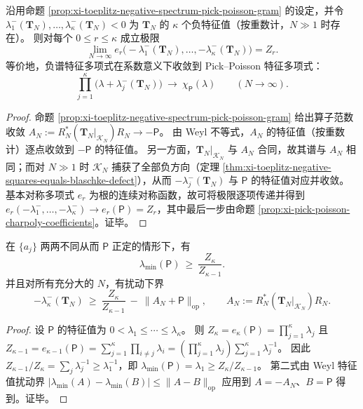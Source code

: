 \begin{proposition}\label{prop:xi-toeplitz-negative-spectrum-coefficient-limit}
沿用命题 \ref{prop:xi-toeplitz-negative-spectrum-pick-poisson-gram} 的设定，并令
\(\lambda_1^-(\mathbf{T}_N),\dots,\lambda_\kappa^-(\mathbf{T}_N)<0\)
为 \(\mathbf{T}_N\) 的 \(\kappa\) 个负特征值（按重数计，\(N\gg 1\) 时存在）。
则对每个 \(0\le r\le\kappa\) 成立极限
\[
\boxed{\;
\lim_{N\to\infty}e_r\!\bigl(-\lambda_1^-(\mathbf{T}_N),\dots,-\lambda_\kappa^-(\mathbf{T}_N)\bigr)=Z_r.\;}
\]
等价地，负谱特征多项式在系数意义下收敛到 Pick--Poisson 特征多项式：
\[
\boxed{\;
\prod_{j=1}^{\kappa}\bigl(\lambda+\lambda_j^-(\mathbf{T}_N)\bigr)\ \longrightarrow\ \chi_{\mathsf P}(\lambda)\qquad(N\to\infty).\;}
\]
\end{proposition}
\begin{proof}
命题 \ref{prop:xi-toeplitz-negative-spectrum-pick-poisson-gram} 给出算子范数收敛
\(
A_N:=R_N^\ast(\mathbf{T}_N|_{\mathcal K_N})R_N\to-\mathsf P
\)。
由 Weyl 不等式，\(A_N\) 的特征值（按重数计）逐点收敛到 \(-\mathsf P\) 的特征值。
另一方面，\(\mathbf{T}_N|_{\mathcal K_N}\) 与 \(A_N\) 合同，故其谱与 \(A_N\) 相同；而对 \(N\gg 1\) 时 \(\mathcal K_N\) 捕获了全部负方向（定理 \ref{thm:xi-toeplitz-negative-squares-equals-blaschke-defect}），从而 \(-\lambda_j^-(\mathbf{T}_N)\) 与 \(\mathsf P\) 的特征值对应并收敛。
基本对称多项式 \(e_r\) 为根的连续对称函数，故可将极限逐项传递并得到
\(
e_r(-\lambda_1^-,\dots,-\lambda_\kappa^-)\to e_r(\mathsf P)=Z_r
\)，其中最后一步由命题 \ref{prop:xi-pick-poisson-charpoly-coefficients}。证毕。
\end{proof}

\begin{corollary}\label{cor:xi-pick-poisson-lambda-min-ratio-bound}
在 \(\{a_j\}\) 两两不同从而 \(\mathsf P\) 正定的情形下，有
\[
\boxed{\;\lambda_{\min}(\mathsf P)\ \ge\ \frac{Z_\kappa}{Z_{\kappa-1}}.\;}
\]
并且对所有充分大的 \(N\)，有扰动下界
\[
-\lambda_\kappa^{-}(\mathbf{T}_N)\ \ge\ \frac{Z_\kappa}{Z_{\kappa-1}}\ -\ \|A_N+\mathsf P\|_{\mathrm{op}},
\qquad
A_N:=R_N^\ast(\mathbf{T}_N|_{\mathcal K_N})R_N.
\]
\end{corollary}
\begin{proof}
设 \(\mathsf P\) 的特征值为 \(0<\lambda_1\le\cdots\le\lambda_\kappa\)。
则
\(
Z_\kappa=e_\kappa(\mathsf P)=\prod_{j=1}^\kappa \lambda_j
\)
且
\(
Z_{\kappa-1}=e_{\kappa-1}(\mathsf P)=\sum_{j=1}^\kappa\prod_{i\ne j}\lambda_i
=(\prod_{j=1}^\kappa\lambda_j)\sum_{j=1}^\kappa\lambda_j^{-1}
\)。
因此
\(
Z_{\kappa-1}/Z_\kappa=\sum_j\lambda_j^{-1}\ge \lambda_1^{-1}
\)，即 \(\lambda_{\min}(\mathsf P)=\lambda_1\ge Z_\kappa/Z_{\kappa-1}\)。
第二式由 Weyl 特征值扰动界 \(|\lambda_{\min}(A)-\lambda_{\min}(B)|\le\|A-B\|_{\mathrm{op}}\) 应用到 \(A=-A_N\)、\(B=\mathsf P\) 得到。证毕。
\end{proof}

